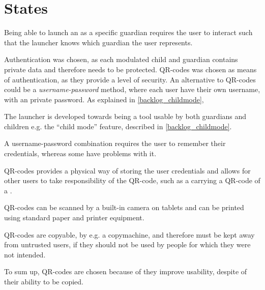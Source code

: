 \section{States}
Being able to launch an \girafapp[] as a specific guardian requires the user to interact such that the launcher knows which guardian the user represents.

Authentication was chosen, as each modulated child and guardian contains private data and therefore needs to be protected. QR-codes was chosen as means of authentication, as they provide a level of security.
An alternative to QR-codes could be a \emph{username-password} method, where each user have their own username, with an private password.
As explained in \autoref{backlog_childmode}, 

The launcher is developed towards being a tool usable by both guardians and children e.g. the ``child mode'' feature, described in \autoref{backlog_childmode}.

A username-password combination requires the user to remember their credentials, whereas some \autists[] have problems with it.

 

QR-codes provides a physical way of storing the user credentials and allows for other users to take responsibility of the QR-code, such as a \guardian[] carrying a QR-code of a \autist[].

QR-codes can be scanned by a built-in camera on tablets and can be printed using standard paper and printer equipment. 

QR-codes are copyable, by e.g. a copymachine, and therefore must be kept away from untrusted users, if they should not be used by people for which they were not intended.

To sum up, QR-codes are chosen because of they improve usability, despite of their ability to be copied.  \\



